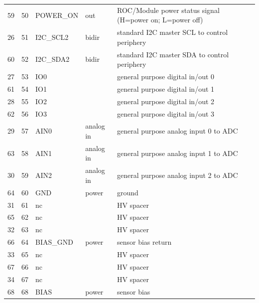 \begin{table}[p]
{\begin{longtable}{cclll}
	    59 & 50 & POWER\_ON & out & ROC/Module power status signal (H=power on; L=power off) \\ 
	    26 & 51 & I2C\_SCL2 & bidir & standard I2C master SCL to control periphery \\ 
	    60 & 52 & I2C\_SDA2 & bidir & standard I2C master SDA to control periphery \\ 
	    27 & 53 & IO0 &  & general purpose digital in/out 0 \\ 
	    61 & 54 & IO1 &  & general purpose digital in/out 1 \\ 
	    28 & 55 & IO2 &  & general purpose digital in/out 2 \\ 
	    62 & 56 & IO3 &  & general purpose digital in/out 3 \\ 
	    29 & 57 & AIN0 & analog in & general purpose analog input 0 to ADC \\ 
	    63 & 58 & AIN1 & analog in & general purpose analog input 1 to ADC \\ 
	    30 & 59 & AIN2 & analog in & general purpose analog input 2 to ADC \\ 
	    64 & 60 & GND & power & ground \\ 
	    31 & 61 & nc &  & HV spacer \\ 
	    65 & 62 & nc &  & HV spacer \\ 
	    32 & 63 & nc &  & HV spacer \\ 
	    66 & 64 & BIAS\_GND & power & sensor bias return \\ 
	    33 & 65 & nc &  & HV spacer \\ 
	    67 & 66 & nc &  & HV spacer \\ 
	    34 & 67 & nc &  & HV spacer \\ 
	    68 & 68 & BIAS & power & sensor bias \\ 
	    \bottomrule
	\end{longtable}
    }
    \label{tab:ROCmoduleInterfaceCable}
\end{table}

